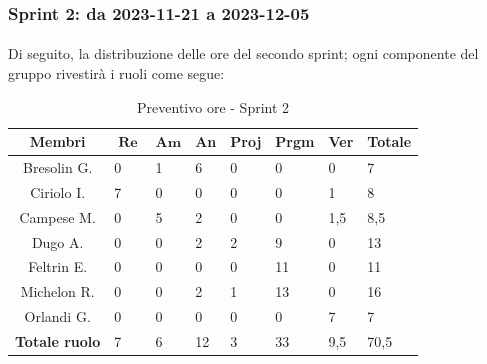 \documentclass[10pt, a4paper]{article}
\begin{document}
{{{{{{{{{%
\subsubsection{Sprint 2: da 2023-11-21 a 2023-12-05 }

\paragraph{}Di seguito, la distribuzione delle ore del secondo sprint; ogni componente del gruppo rivestirà i ruoli come segue:

\begin{table}[H]
\begin{tabularx}{\textwidth}{c|X|X|X|X|X|X|X}
        \textbf{Membri} & $\operatorname{\textbf{Re}}$ & $\mathrm{\textbf{Am}}$ & \textbf{An} & \textbf{Proj} & \textbf{Prgm} & \textbf{Ver} & \textbf{Totale} \\
        \hline Bresolin G. & 0 & 1 & \cellcolor{primarycolor}6 & 0 & 0 & 0 & 7 \\
        \hline Ciriolo I.  & \cellcolor{primarycolor}7 & 0 & 0 & 0 & 0 & 1 & 8 \\
        \hline Campese M.  & 0 & \cellcolor{primarycolor}5 & 2 & 0 & 0 & 1,5 & 8,5 \\
        \hline Dugo A.     & 0 & 0 & 2 & \cellcolor{primarycolor}2 & 9 & 0 & 13 \\
        \hline Feltrin E.  & 0 & 0 & 0 & 0 & \cellcolor{primarycolor}11 & 0 & 11 \\
        \hline Michelon R. & 0 & 0 & 2 & 1 & \cellcolor{primarycolor}13 & 0 & 16 \\
        \hline Orlandi G.  & 0 & 0 & 0 & 0 & 0 & \cellcolor{primarycolor}7 & 7 \\
        \hline
        \textbf{Totale ruolo} & 7 & 6 & 12 & 3 & 33 & 9,5 & 70,5 
    \end{tabularx}
    \caption{Preventivo ore - Sprint 2}
    \end{table}

}}}}}}}}}
\end{document}

